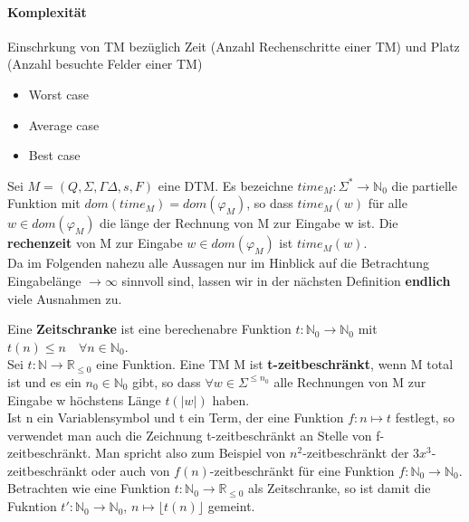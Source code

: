 \paragraph*{Komplexität} 
    Einschrkung von TM bezüglich Zeit (Anzahl Rechenschritte einer TM) und Platz (Anzahl besuchte Felder einer TM)
    \begin{itemize}
        \item Worst case
        \item Average case
        \item Best case
    \end{itemize}

    Sei \(M = (Q, \Sigma, \Gamma \Delta, s, F)\) eine DTM. Es bezeichne \(time_M:\Sigma^* \to \mathbb{N}_0\) die partielle Funktion mit \(dom(time_M) = dom (\varphi_M)\), so dass \(time_M(w)\) für alle \(w \in dom (\varphi_M)\) die länge der Rechnung von M zur Eingabe w ist. Die \textbf{rechenzeit} von M zur Eingabe \(w \in dom (\varphi_M)\) ist \(time_M(w)\). \\
    Da im Folgenden nahezu alle Aussagen nur im Hinblick auf die Betrachtung Eingabelänge \(\to \infty\) sinnvoll sind, lassen wir in der nächsten Definition \textbf{endlich} viele Ausnahmen zu.

    Eine \textbf{Zeitschranke} ist eine berechenabre Funktion \(t: \mathbb{N}_0 \to \mathbb{N}_0\) mit \(t(n)\leq n \quad \forall n \in \mathbb{N}_0\).\\ Sei \(t: \mathbb{N}\to \mathbb{R}_{\leq 0}\) eine Funktion. Eine TM M ist \textbf{t-zeitbeschränkt}, wenn M total ist und es ein \(n_0 \in \mathbb{N}_0\) gibt, so dass \(\forall w \in \Sigma^{\leq n_0}\) alle Rechnungen von M zur Eingabe w höchstens Länge \(t(|w|)\) haben.\vspace{0.5cm}\\Ist n ein Variablensymbol und t ein Term, der eine Funktion \(f: n \mapsto t\) festlegt, so verwendet man auch die Zeichnung t-zeitbeschränkt an Stelle von f-zeitbeschränkt. Man spricht also zum Beispiel von \(n^2\)-zeitbeschränkt der \(3x^3\)-zeitbeschränkt oder auch von \(f(n)\)-zeitbeschränkt für eine Funktion \(f: \mathbb{N}_0 \to \mathbb{N}_0\). Betrachten wie eine Funktion \(t: \mathbb{N}_0 \to \mathbb{R}_{\leq 0}\) als Zeitschranke, so ist damit die Fukntion \(t': \mathbb{N}_0 \to \mathbb{N}_0\), \(n \mapsto \lfloor t(n)\rfloor\) gemeint.

